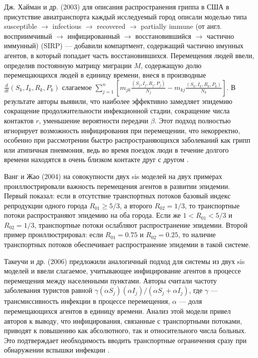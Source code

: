 \documentclass[a4paper,12pt]{article} %
\begin{document}
Дж. Хайман и др. (2003) \cite{hyman2003modeling} для описания распространения гриппа в США в присутствие авиатранспорта каждый исследуемый город описали моделью типа susceptible $\rightarrow$ infectious $\rightarrow$ recovered $\rightarrow$ partially immune (от англ. восприимчивый $\rightarrow$ инфицированный $\rightarrow$ восстановившийся $\rightarrow$ частично иммунный) (SIRP) --- добавили компартмент, содержащий частично имунных агентов, в который попадает часть восстановившихся. Перемещения людей ввели, определив постоянную матрицу миграции $M$, содержащую долю перемещающихся людей в единицу времени, внеся в производные $\frac{d}{dt}(S_k,I_k,R_k,P_k)$ слагаемое $\sum\limits_{j=1}^n \left[m_{jk}\frac{(S_j,I_j,R_j,P_j)}{N_j}-m_{kj}\frac{(S_k,I_k,R_k,P_k)}{N_k}\right]$. В результате авторы выявили, что наиболее эффективно замедляет эпидемию сокращение продолжительности инфекционной стадии, сокращение числа контактов $r$, уменьшение вероятности передачи $\beta$. Этот подход полностью игнорирует возможность инфицирования при перемещении, что некорректно, особенно при рассмотрении быстро распространяющихся заболеваний как грипп или атипичная пневмония, ведь во время поездок люди в течение долгого времени находятся в очень близком контакте друг с другом \cite{li2021modeling}.

Ванг и Жао (2004) \cite{wang2004epidemic} на совокупности двух \gls{sis} моделей на двух примерах проиллюстрировали важность перемещения агентов в развитии эпидемии. Первый показал: если в отсутствие транспортных потоков базовый индекс репродукции одного города $R_{01}\geqslant 5/3$, а второго $R_{02} = 1/3$, то транспортные потоки распространяют эпидемию на оба города. Если же $1 < R_{01} < 5/3$ и $R_{02} = 1/3$, транспортные потоки ослабляют распространение эпидемии. Второй пример проиллюстрировал: если $R_{01} = 0.75$ и $R_{02} = 0.25$, то наличие транспортных потоков обеспечивает распространение эпидемии в такой системе.

Такеучи и др. (2006) \cite{takeuchi2006spreading} предложили аналогичный подход для системы из двух \gls{sis} моделей и ввели слагаемое, учитывающее инфицирование агентов в процессе перемещения между населенными пунктами. Авторы считали частоту заболевания туристов равной $\gamma(\alpha S_j)(\alpha I_j)/(\alpha S_j+\alpha I_j)$, где $\gamma$ --- трансмиссивность инфекции в процессе перемещения, $\alpha$ --- доля перемещающихся агентов в единицу времени. Анализ этой модели привел авторов к выводу, что инфицирования, связанные с транспортными потоками, приводят к повышению как абсолютного, так и относительного числа больных. Это подтверждает необходимость вводить транспортные ограничения сразу при обнаружении вспышки инфекции \cite{takeuchi2006spreading}.
\end{document}

